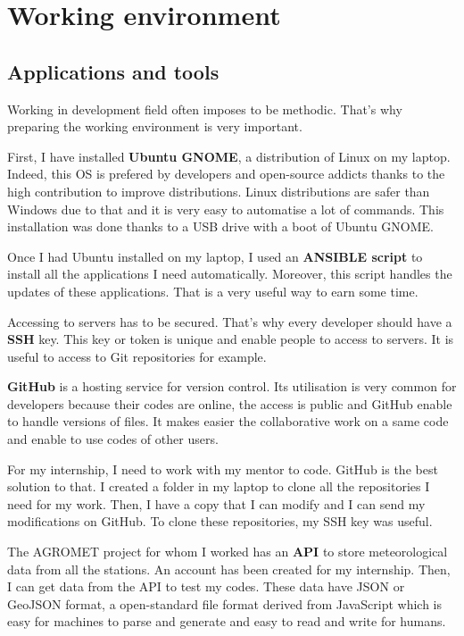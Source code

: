 \documentclass[12pt,twoside]{reedthesis}
\theoremstyle{definition}
\theoremstyle{definition}
\theoremstyle{definition}
\theoremstyle{remark}
\begin{document}
\chapter{Working environment}\label{workenv}

\section{Applications and tools}\label{applications-and-tools}

Working in development field often imposes to be methodic. That's why
preparing the working environment is very important.

First, I have installed \textbf{Ubuntu GNOME}, a distribution of Linux
on my laptop. Indeed, this OS is prefered by developers and open-source
addicts thanks to the high contribution to improve distributions. Linux
distributions are safer than Windows due to that and it is very easy to
automatise a lot of commands. This installation was done thanks to a USB
drive with a boot of Ubuntu GNOME.

Once I had Ubuntu installed on my laptop, I used an \textbf{ANSIBLE
script} to install all the applications I need automatically. Moreover,
this script handles the updates of these applications. That is a very
useful way to earn some time.

Accessing to servers has to be secured. That's why every developer
should have a \textbf{SSH} key. This key or token is unique and enable
people to access to servers. It is useful to access to Git repositories
for example.

\textbf{GitHub} is a hosting service for version control. Its
utilisation is very common for developers because their codes are
online, the access is public and GitHub enable to handle versions of
files. It makes easier the collaborative work on a same code and enable
to use codes of other users.

For my internship, I need to work with my mentor to code. GitHub is the
best solution to that. I created a folder in my laptop to clone all the
repositories I need for my work. Then, I have a copy that I can modify
and I can send my modifications on GitHub. To clone these repositories,
my SSH key was useful.

The AGROMET project for whom I worked has an \textbf{API} to store
meteorological data from all the stations. An account has been created
for my internship. Then, I can get data from the API to test my codes.
These data have JSON or GeoJSON format, a open-standard file format
derived from JavaScript which is easy for machines to parse and generate
and easy to read and write for humans.
\end{document}
